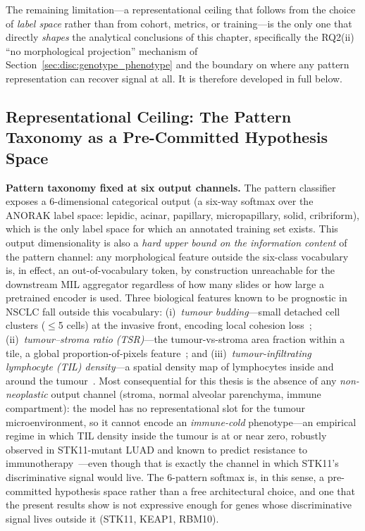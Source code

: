 The remaining limitation---a representational ceiling that follows
from the choice of \emph{label space} rather than from cohort,
metrics, or training---is the only one that directly \emph{shapes}
the analytical conclusions of this chapter, specifically the
RQ2(ii) ``no morphological projection'' mechanism of
Section~\ref{sec:disc:genotype_phenotype} and the boundary on
where any pattern representation can recover signal at all.
It is therefore developed in full below.

\subsection{Representational Ceiling: The Pattern Taxonomy as a
Pre-Committed Hypothesis Space}
\label{sec:disc:lim:method}

\textbf{Pattern taxonomy fixed at six output channels.}
The pattern classifier exposes a 6-dimensional categorical
output (a six-way softmax over the ANORAK label space:
lepidic, acinar, papillary, micropapillary, solid, cribriform),
which is the only label space for which an annotated training
set exists.
This output dimensionality is also a \emph{hard upper bound on
the information content} of the pattern channel: any
morphological feature outside the six-class vocabulary is, in
effect, an out-of-vocabulary token, by construction unreachable
for the downstream MIL aggregator regardless of how many slides
or how large a pretrained encoder is used.
Three biological features known to be prognostic in NSCLC fall
outside this vocabulary:
(i)~\emph{tumour budding}---small detached cell clusters
($\leq$5 cells) at the invasive front, encoding local cohesion
loss~\cite{kadota2015budding};
(ii)~\emph{tumour--stroma ratio (TSR)}---the
tumour-vs-stroma area fraction within a tile, a global
proportion-of-pixels feature~\cite{zhang2015tsr};
and (iii)~\emph{tumour-infiltrating lymphocyte (TIL) density}---a
spatial density map of lymphocytes inside and around the
tumour~\cite{brambilla2016til}.
Most consequential for this thesis is the absence of any
\emph{non-neoplastic} output channel (stroma, normal alveolar
parenchyma, immune compartment): the model has no representational
slot for the tumour microenvironment, so it cannot encode an
\emph{immune-cold} phenotype---an empirical regime in which TIL
density inside the tumour is at or near zero, robustly observed in
STK11-mutant LUAD and known to predict resistance to
immunotherapy~\cite{skoulidis2018stk11pd1}---even though that is
exactly the channel in which STK11's discriminative signal would
live.
The 6-pattern softmax is, in this sense, a pre-committed
hypothesis space rather than a free architectural choice, and
one that the present results show is not expressive enough for
genes whose discriminative signal lives outside it
(STK11, KEAP1, RBM10).


